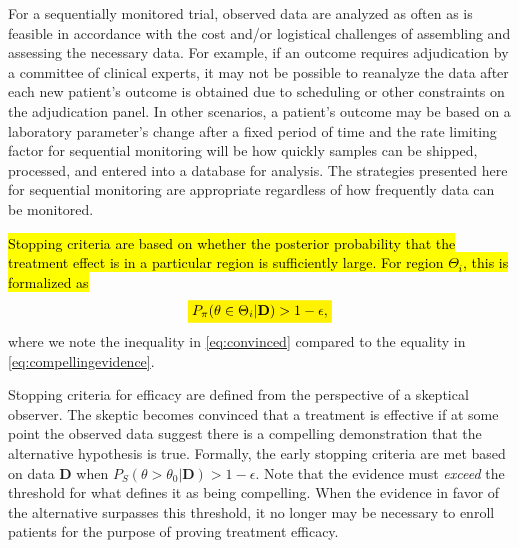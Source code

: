 \documentclass[12pt]{article}
\newcommand{\mathcolorbox}[2]{\colorbox{#1}{$\displaystyle #2$}}
\begin{document}
For a sequentially monitored trial, observed data are analyzed as often as is feasible in accordance with 
the cost and/or logistical challenges of assembling and assessing the necessary data.
%
For example, if an outcome requires adjudication by a committee of clinical experts, it may not be possible to reanalyze the
data after each new patient's outcome is obtained due to scheduling or other constraints on the adjudication panel.
%
In other scenarios, a patient's outcome may be based on a laboratory parameter's change after a fixed period of time
and the rate limiting factor for sequential monitoring will be how quickly samples can be shipped, processed, and entered
into a database for analysis.  
%
The strategies presented here for sequential monitoring are appropriate regardless of how frequently data can be monitored.


\hl{Stopping criteria are based on whether the posterior probability that the treatment effect is in a particular region is sufficiently large. For region $\Theta_i$, this is formalized as}
\begin{equation}\label{eq:convinced}
\mathcolorbox{yellow}		{P_\pi(\theta\in\Theta_i|\mathbf{D}) > 1-\epsilon,}
\end{equation} 
where we note the inequality in \eqref{eq:convinced} compared to the equality in \eqref{eq:compellingevidence}.

Stopping criteria for efficacy are defined from the perspective of a skeptical observer. 
The skeptic becomes convinced that a treatment is effective if at some point the observed data suggest there is 
a compelling demonstration that the alternative hypothesis is true. 
Formally, the early stopping criteria are met based on data $\mathbf{D}$ when $P_S(\theta>\theta_0|\mathbf{D})>1-\epsilon$.
Note that the evidence must \textit{exceed} the threshold for what defines it as being compelling.
When the evidence in favor of the alternative surpasses this threshold, it no longer may be necessary to 
enroll patients for the purpose of proving treatment efficacy.
\end{document}
